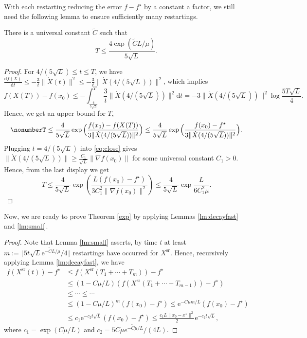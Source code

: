 \documentclass[twoside,11pt]{article}
\newcommand{\e}[1]{\mathrm{e}^{#1}}
\newcommand{\norm}[1]{\|#1\|}
\newcommand{\xsr}{X^{\mathrm{sr}}}
\renewcommand{\d}{{\mathrm{d}}}
\begin{document}
With each restarting reducing the error $f - f^\star$ by a constant a factor, we still need the following lemma to ensure sufficiently many restartings.
\begin{lemma}\label{lm:small}
There is a universal constant $\tilde C$ such that
\[
T \le \frac{4\exp\left(\tilde C L/\mu\right)}{5\sqrt{L}}.
\]
\end{lemma}
\begin{proof}
For $4/(5\sqrt{L}) \le t \le T$, we have $\frac{\d f(X)}{\d t} \le -\frac{3}{t}\norm{\dot X(t)}^2 \le -\frac{3}{t}\norm{\dot X(4/(5\sqrt{L}))}^2$, which implies
\[
f(X(T)) - f(x_0) \le -\int_{\frac{4}{5\sqrt{L}}}^T\frac{3}{t}\norm{\dot X(4/(5\sqrt{L}))}^2 \d t
= -3\norm{\dot X(4/(5\sqrt{L}))}^2\log\frac{5T\sqrt{L}}{4}.
\]
Hence, we get an upper bound for $T$,
\begin{equation}\nonumber%
T \le \frac{4}{5\sqrt{L}}\exp\Big{(}\frac{f(x_0) - f(X(T))}{3\norm{\dot X(4/(5\sqrt{L}))}^2} \Big{)}\le \frac{4}{5\sqrt{L}}\exp\Big{(}\frac{f(x_0) - f^\star}{3\norm{\dot X(4/(5\sqrt{L}))}^2} \Big{)}.\\
\end{equation}
Plugging $t = 4/(5\sqrt{L})$ into \eqref{eq:close} gives $\norm{\dot X(4/(5\sqrt{L}))} \geq \frac{C_1}{\sqrt{L}}\norm{\nabla f(x_0)}$ for some universal constant $C_1 > 0$. Hence, from the last display we get
\begin{equation*}
T \le\frac{4}{5\sqrt{L}}\exp\left( \frac{L(f(x_0)-f^\star)}{3C_1^2\norm{\nabla f(x_0)}^2} \right) \le \frac{4}{5\sqrt{L}}\exp\frac{L}{6C_1^2\mu}.
\end{equation*}
\end{proof}






Now, we are ready to prove Theorem \ref{exp} by applying Lemmas \ref{lm:decayfast} and \ref{lm:small}.
\begin{proof}
Note that Lemma \ref{lm:small} asserts, by time $t$ at least $m := \lfloor 5t\sqrt{L}\e{-\tilde C L/\mu}/4\rfloor$
restartings have occurred for $\xsr$. Hence, recursively applying Lemma \ref{lm:decayfast}, we have
\begin{align*}
f(\xsr(t)) - f^\star &\le f \left( \xsr(T_1 + \cdots + T_m) \right) - f^\star \\
&\le (1 - C\mu/L) \left(f \left( \xsr(T_1 + \cdots + T_{m-1}) \right) - f^\star \right)\\
& \le \cdots \le \cdots \\
&\le (1 - C\mu/L)^m (f(x_0) - f^\star)  \le \e{- C\mu m/L} (f(x_0) - f^\star) \\ 
&\le c_1\e{-c_2t\sqrt{L}}(f(x_0) - f^\star) \le \frac{c_1L\|x_0 - x^\star\|^2}{2}\e{-c_2t\sqrt{L}},
\end{align*}
where $c_1 = \exp(C\mu/L)$ and $c_2 = 5C\mu e^{-\tilde C \mu/L}/(4L)$.
\end{proof}
\end{document}

